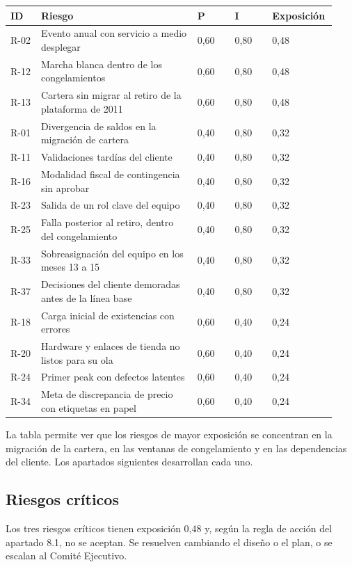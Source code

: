 \documentclass[11pt]{article}
\begin{document}
\begin{longtable}{p{0.097\linewidth}p{0.465\linewidth}p{0.116\linewidth}p{0.116\linewidth}p{0.136\linewidth}}
\toprule
\textbf{ID} & \textbf{Riesgo} & \textbf{P} & \textbf{I} & \textbf{Exposición} \\
\midrule
\endhead
\bottomrule
\endlastfoot
R-02 & Evento anual con servicio a medio desplegar & 0,60 & 0,80 & 0,48 \\
R-12 & Marcha blanca dentro de los congelamientos & 0,60 & 0,80 & 0,48 \\
R-13 & Cartera sin migrar al retiro de la plataforma de 2011 & 0,60 & 0,80 & 0,48 \\
R-01 & Divergencia de saldos en la migración de cartera & 0,40 & 0,80 & 0,32 \\
R-11 & Validaciones tardías del cliente & 0,40 & 0,80 & 0,32 \\
R-16 & Modalidad fiscal de contingencia sin aprobar & 0,40 & 0,80 & 0,32 \\
R-23 & Salida de un rol clave del equipo & 0,40 & 0,80 & 0,32 \\
R-25 & Falla posterior al retiro, dentro del congelamiento & 0,40 & 0,80 & 0,32 \\
R-33 & Sobreasignación del equipo en los meses 13 a 15 & 0,40 & 0,80 & 0,32 \\
R-37 & Decisiones del cliente demoradas antes de la línea base & 0,40 & 0,80 & 0,32 \\
R-18 & Carga inicial de existencias con errores & 0,60 & 0,40 & 0,24 \\
R-20 & Hardware y enlaces de tienda no listos para su ola & 0,60 & 0,40 & 0,24 \\
R-24 & Primer peak con defectos latentes & 0,60 & 0,40 & 0,24 \\
R-34 & Meta de discrepancia de precio con etiquetas en papel & 0,60 & 0,40 & 0,24 \\
\end{longtable}

La tabla permite ver que los riesgos de mayor exposición se concentran en la migración de la cartera, en las ventanas de congelamiento y en las dependencias del cliente. Los apartados siguientes desarrollan cada uno.

\subsection{Riesgos críticos}

Los tres riesgos críticos tienen exposición 0,48 y, según la regla de acción del apartado 8.1, no se aceptan. Se resuelven cambiando el diseño o el plan, o se escalan al Comité Ejecutivo.
\end{document}
